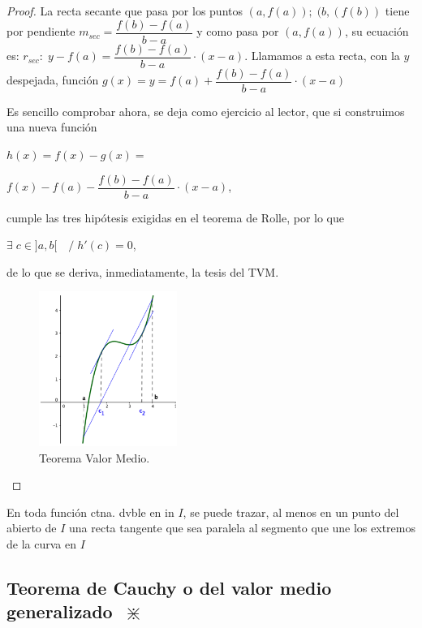 	\begin{proof}
		La recta secante que pasa por los puntos  $(a,f(a)); \; (b,(f(b))$ tiene por pendiente $m_{sec}=\dfrac {f(b)-f(a)}{b-a}$ y como pasa por $(a,f(a))$, su ecuación es: $r_{sec}:\; y-f(a)= \dfrac {f(b)-f(a)}{b-a} \cdot (x-a)$. Llamamos a esta recta, con la $y$ despejada, función $g(x)=y=f(a)+ \dfrac {f(b)-f(a)}{b-a} \cdot (x-a)$
		
		\clearpage
		
		\begin{multicols}{2} 
		
		Es sencillo comprobar ahora, se deja como ejercicio al lector, que si construimos una nueva función 
		
		$h(x)=f(x)-g(x)=$
		
		$f(x)-f(a)- \dfrac {f(b)-f(a)}{b-a} \cdot (x-a)$, 
		
		cumple las tres hipótesis exigidas en el teorema de Rolle, por lo que 
		
		$\exists \; c\in]a,b[ \quad / \; h'(c)=0$, 
		
		de lo que se deriva, inmediatamente, la tesis del TVM.
		
		\begin{figure}[H]
		\centering
		\includegraphics[width=0.4\textwidth]{imagenes/imagenes05/T05IM28.png}
		\caption {Teorema Valor Medio.}
		\end{figure}
		\end{multicols}
		
		\end{proof}
		
		\vspace{-3mm}
		
		En toda función ctna. dvble en in $I$, se puede trazar, al menos en un punto del abierto de $I$ una recta tangente que sea paralela al segmento que une los extremos de la curva en $I$
	
	\subsection{Teorema de Cauchy o del valor medio generalizado $\; \divideontimes$}
	
